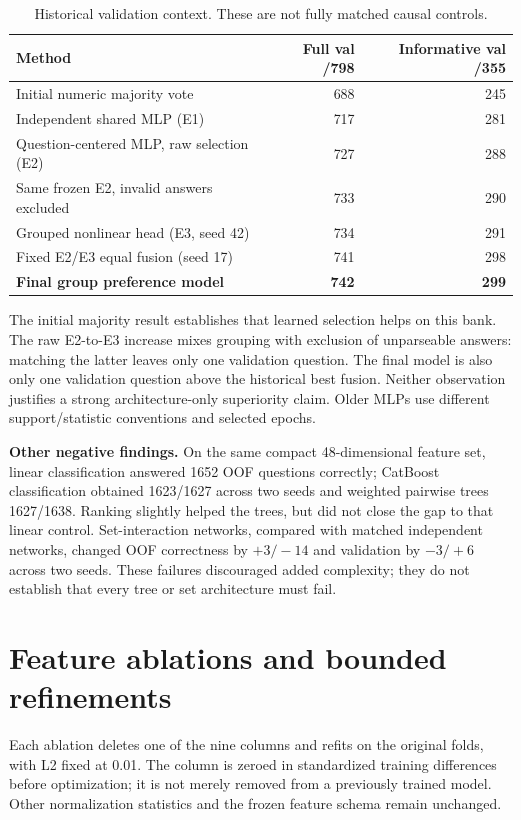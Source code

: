 \documentclass[11pt,a4paper]{article}
\newcommand{\pageheading}[1]{\section{#1}}
\begin{document}
\begin{table}[h]\centering
\caption{Historical validation context. These are not fully matched causal controls.}
\begin{tabular}{lrr}\toprule
Method & Full val /798 & Informative val /355 \\\midrule
Initial numeric majority vote & 688 & 245 \\
Independent shared MLP (E1) & 717 & 281 \\
Question-centered MLP, raw selection (E2) & 727 & 288 \\
Same frozen E2, invalid answers excluded & 733 & 290 \\
Grouped nonlinear head (E3, seed 42) & 734 & 291 \\
Fixed E2/E3 equal fusion (seed 17) & 741 & 298 \\
\textbf{Final group preference model} & \textbf{742} & \textbf{299} \\
\bottomrule\end{tabular}
\end{table}

The initial majority result establishes that learned selection helps on this
bank. The raw E2-to-E3 increase mixes grouping with exclusion of unparseable
answers: matching the latter leaves only one validation question. The final
model is also only one validation question above the historical best fusion.
Neither observation justifies a strong architecture-only superiority claim.
Older MLPs use different support/statistic conventions and selected epochs.

\textbf{Other negative findings.} On the same compact 48-dimensional feature
set, linear classification answered 1652 OOF questions correctly; CatBoost
classification obtained 1623/1627 across two seeds and weighted pairwise trees
1627/1638. Ranking slightly helped the trees, but did not close the gap to that
linear control. Set-interaction networks, compared with matched independent
networks, changed OOF correctness by $+3/-14$ and validation by $-3/+6$ across
two seeds. These failures discouraged added complexity; they do not establish
that every tree or set architecture must fail.

\newpage
\pageheading{Feature ablations and bounded refinements}
Each ablation deletes one of the nine columns and refits on the original folds,
with L2 fixed at 0.01. The column is zeroed in standardized training differences
before optimization; it is not merely removed from a previously trained model.
Other normalization statistics and the frozen feature schema remain unchanged.
\end{document}
